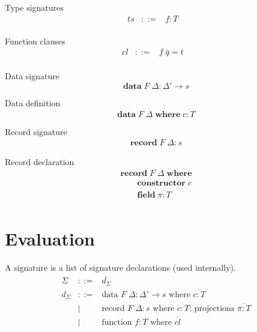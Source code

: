 \documentclass[acmlarge]{acmart}\settopmatter{}
\renewcommand{\|}{\mid}
\begin{document}
Type signatures
\[\begin{array}{lrll}
ts &::=& f : T &\\
\end{array} \]

Function clauses
\[\begin{array}{lrll}
cl &::=& f\; \bar{q} = t &\\
\end{array} \]

Data signature
\[
\textbf{data}\; F\; \Delta : \Delta' \rightarrow s
\]

Data definition
\[
\textbf{data}\; F\; \Delta \;\textbf{where}\; \overline{c : T}
\]

Record signature
\[ \begin{array}{l}
\textbf{record}\; F\; \Delta : s
\end{array}\]

Record declaration
\[ \begin{array}{l}
\textbf{record}\; F\; \Delta \; \textbf{where} \\
\qquad  \textbf{constructor}\; c \\
\qquad  \textbf{field}\; \overline{\pi : T} \\
\end{array}\]




\section{Evaluation}
\label{sec:evaluation}

\newcommand{\datasig}{\text{data } F\; \Delta : \Delta' \to s \text{ where } \overline{c : T}}
\newcommand{\recsig}{\text{record } F\;\Delta : s \text{ where
    $c : T$; } \text{projections } \overline{\pi : T} }
\newcommand{\funsig}{\text{function } f : T \text{ where } \overline{cl}}

A signature is a list of signature declarations (used internally).
\[
\begin{array}{lcl}
\Sigma & ::= &  \overline{d_\Sigma} \\
d_\Sigma & ::= & \datasig \\
& \| & \recsig \\
& \| & \funsig
\end{array}
\]
\end{document}
